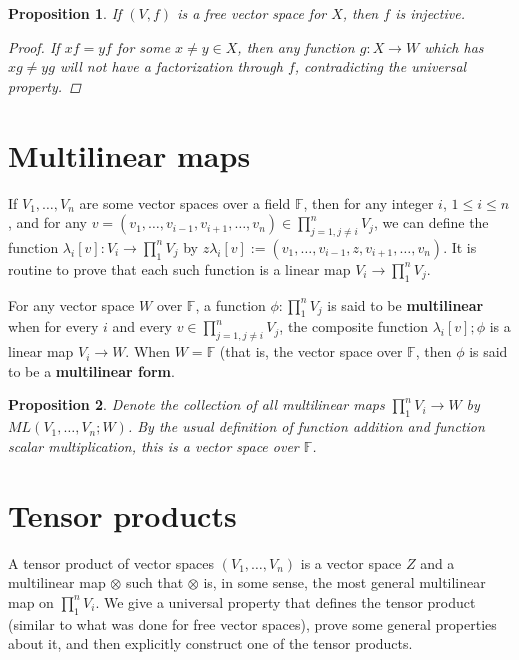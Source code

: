 \documentclass[a4paper,14pt]{article}
\newtheorem*{prop}{Proposition}
\begin{document}
\begin{prop}
If $(V, f)$ is a free vector space for $X$, then $f$ is injective.
\begin{proof}
If $xf = yf$ for some $x \neq y \in X$, then any function $g: X \to W$ which has $xg \neq yg$ will not have a factorization through $f$, contradicting the universal property.
\end{proof}
\end{prop}

\section{Multilinear maps}
If $V_1, \ldots, V_n$ are some vector spaces over a field $\mathbb{F}$, then for any integer $i$, $1 \leq i \leq n$, and for any $v = (v_1, \ldots, v_{i-1}, v_{i+1}, \ldots, v_n) \in \prod_{j=1, j \neq i}^n V_j$, we can define the function $\lambda_i[v]: V_i \to \prod_1^n V_j$ by $z \lambda_i[v] := (v_1, \ldots, v_{i-1}, z, v_{i+1}, \ldots, v_n)$. It is routine to prove that each such function is a linear map $V_i \to \prod_1^n V_j$.

For any vector space $W$ over $\mathbb{F}$, a function $\phi: \prod_1^n V_j$ is said to be \textbf{multilinear} when for every $i$ and every $v \in \prod_{j=1, j \neq i}^n V_j$, the composite function $\lambda_i[v];\phi$ is a linear map $V_i \to W$. When $W = \mathbb{F}$ (that is, the vector space over $\mathbb{F}$, then $\phi$ is said to be a \textbf{multilinear form}.

\begin{prop}
Denote the collection of all multilinear maps $\prod_1^n V_i \to W$ by $ML(V_1, \ldots, V_n; W)$. By the usual definition of function addition and function scalar multiplication, this is a vector space over $\mathbb{F}$.
\end{prop}

\section{Tensor products}
A tensor product of vector spaces $(V_1, \ldots, V_n)$ is a vector space $Z$ and a multilinear map $\otimes$ such that $\otimes$ is, in some sense, the most general multilinear map on $\prod_1^n V_i$. We give a universal property that defines the tensor product (similar to what was done for free vector spaces), prove some general properties about it, and then explicitly construct one of the tensor products.
\end{document}
